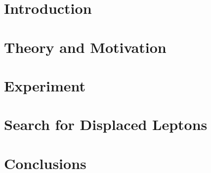\cleardoublepage %



\part{Introduction}


\cleardoublepage

\ctparttext{}
\part{Theory and Motivation}



\cleardoublepage 

\ctparttext{}
\part{Experiment}







\cleardoublepage 

\ctparttext{}
\part{Search for Displaced Leptons}








\cleardoublepage 

\ctparttext{}
\part{Conclusions}

